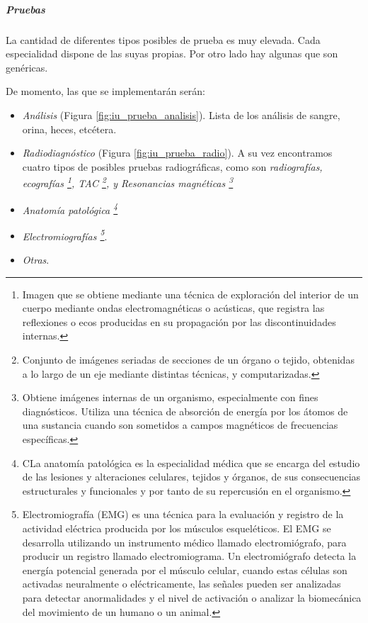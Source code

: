 \documentclass[a4paper,oneside,11pt]{book}
\begin{document}
		

		\subparagraph{Pruebas} %
		\label{par:pruebas}
			
			La cantidad de diferentes tipos posibles de prueba es muy elevada. Cada especialidad dispone de las suyas propias. Por otro lado hay algunas que son genéricas.
			
			De momento, las que se implementarán serán:
	
			\begin{itemize}
				\item \textit{Análisis} (Figura \ref{fig:iu_prueba_analisis}). Lista de los análisis de sangre, orina, heces, etcétera.
				\item \textit{Radiodiagnóstico} (Figura \ref{fig:iu_prueba_radio}). A su vez encontramos cuatro tipos de posibles pruebas radiográficas, como son \textit{radiografías, ecografías \footnote{Imagen que se obtiene mediante una técnica de exploración del interior de un cuerpo mediante ondas electromagnéticas o acústicas, que registra las reflexiones o ecos producidas en su propagación por las discontinuidades internas.}, TAC \footnote{Conjunto de imágenes seriadas de secciones de un órgano o tejido, obtenidas a lo largo de un eje mediante distintas técnicas, y computarizadas.}, y Resonancias magnéticas \footnote{Obtiene imágenes internas de un organismo, especialmente con fines diagnósticos. Utiliza una técnica de absorción de energía por los átomos de una sustancia cuando son sometidos a campos magnéticos de frecuencias específicas.}}
				\item \textit{Anatomía patológica \footnote{CLa anatomía patológica es la especialidad médica que se encarga del estudio de las lesiones y alteraciones celulares, tejidos y órganos, de sus consecuencias estructurales y funcionales y por tanto de su repercusión en el organismo.}}
				\item \textit{Electromiografías \footnote{Electromiografía (EMG) es una técnica para la evaluación y registro de la actividad eléctrica producida por los músculos esqueléticos. El EMG se desarrolla utilizando un instrumento médico llamado electromiógrafo, para producir un registro llamado electromiograma. Un electromiógrafo detecta la energía potencial generada por el músculo celular, cuando estas células son activadas neuralmente o eléctricamente, las señales pueden ser analizadas para detectar anormalidades y el nivel de activación o analizar la biomecánica del movimiento de un humano o un animal.}}.
				\item \textit{Otras}.
			\end{itemize}
			
\end{document}
